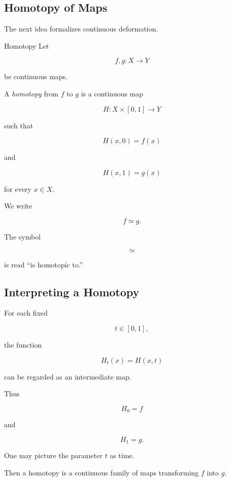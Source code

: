 \subsection{Homotopy of Maps}
\label{subsec:homotopy-of-maps}

The next idea formalizes continuous deformation.

\begin{definitionbox}{Homotopy}
Let

\[
f,g:X\to Y
\]

be continuous maps.

A \emph{homotopy} from \(f\) to \(g\) is a continuous map

\[
\boxed{
H:X\times[0,1]\to Y
}
\]

such that

\[
H(x,0)=f(x)
\]

and

\[
H(x,1)=g(x)
\]

for every \(x\in X\).
\end{definitionbox}

We write

\[
\boxed{
f\simeq g.
}
\]

The symbol

\[
\simeq
\]

is read ``is homotopic to.''

\subsection{Interpreting a Homotopy}
\label{subsec:interpreting-homotopy}

For each fixed

\[
t\in[0,1],
\]

the function

\[
H_t(x)=H(x,t)
\]

can be regarded as an intermediate map.

Thus

\[
H_0=f
\]

and

\[
H_1=g.
\]

One may picture the parameter \(t\) as time.

Then a homotopy is a continuous family of maps transforming \(f\) into \(g\).

